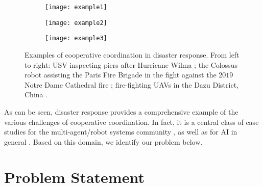 \begin{figure}[t]
    \centering
    \begin{subfigure}[b]{.325\textwidth}
        \texttt{[image: example1]}
    \end{subfigure}
    \begin{subfigure}[b]{.325\textwidth}
        \texttt{[image: example2]}
    \end{subfigure}
    \begin{subfigure}[b]{.325\textwidth}
        \texttt{[image: example3]}
    \end{subfigure}
    \caption[Examples of cooperative coordination in disaster response]{%
    Examples of cooperative coordination in disaster response. From left to right: USV
    inspecting piers after Hurricane Wilma \cite{murphy2014}; the Colossus robot assisting
    the Paris Fire Brigade in the fight against the $2019$ Notre Dame Cathedral fire
    \cite{colossus}; fire-fighting UAVs in the Dazu District, China \cite{dazu}.}
\end{figure}

\iffalse
Oother motivating domains:
   - resource allocation (e.g., hospital workforce)
   - vehicle routing
   - combine harvesting
   - multi-factory scheduling
   - project scheduling
   - automated guided vehicles
   - open vehicle fleets
   - green maritime transportation
   - sensor networks
\fi

As can be seen, disaster response provides a comprehensive example of the various
challenges of cooperative coordination. In fact, it is a central class of case studies for
the multi-agent/robot systems community
\cite{rcr2001,murphy2014,dadvar2021,murphy2016a,murphy2016b}, as well as for AI in general
\cite{imran2014}. Based on this domain, we identify our problem below.

\section{Problem Statement}\label{sec:pstat}

